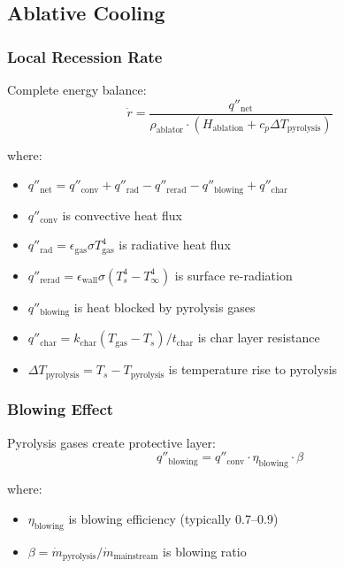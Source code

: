 \documentclass[12pt,a4paper]{article}
\newcommand{\mdot}{\dot{m}}
\begin{document}
\subsection{Ablative Cooling}

\subsubsection{Local Recession Rate}

Complete energy balance:
\begin{equation}
\dot{r} = \frac{q''_{\text{net}}}{\rho_{\text{ablator}} \cdot (H_{\text{ablation}} + c_p \Delta T_{\text{pyrolysis}})}
\end{equation}

where:
\begin{itemize}
    \item $q''_{\text{net}} = q''_{\text{conv}} + q''_{\text{rad}} - q''_{\text{rerad}} - q''_{\text{blowing}} + q''_{\text{char}}$
    \item $q''_{\text{conv}}$ is convective heat flux
    \item $q''_{\text{rad}} = \epsilon_{\text{gas}} \sigma T_{\text{gas}}^4$ is radiative heat flux
    \item $q''_{\text{rerad}} = \epsilon_{\text{wall}} \sigma (T_s^4 - T_{\infty}^4)$ is surface re-radiation
    \item $q''_{\text{blowing}}$ is heat blocked by pyrolysis gases
    \item $q''_{\text{char}} = k_{\text{char}} (T_{\text{gas}} - T_s) / t_{\text{char}}$ is char layer resistance
    \item $\Delta T_{\text{pyrolysis}} = T_s - T_{\text{pyrolysis}}$ is temperature rise to pyrolysis
\end{itemize}

\subsubsection{Blowing Effect}

Pyrolysis gases create protective layer:
\begin{equation}
q''_{\text{blowing}} = q''_{\text{conv}} \cdot \eta_{\text{blowing}} \cdot \beta
\end{equation}

where:
\begin{itemize}
    \item $\eta_{\text{blowing}}$ is blowing efficiency (typically 0.7--0.9)
    \item $\beta = \mdot_{\text{pyrolysis}} / \mdot_{\text{mainstream}}$ is blowing ratio
\end{itemize}
\end{document}
